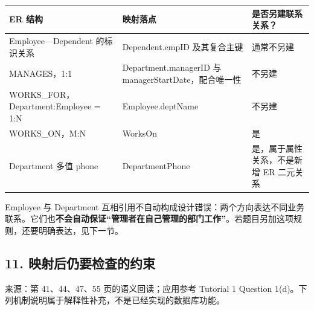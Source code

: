 \begin{longtable}[]{@{}
  >{\raggedright\arraybackslash}p{}
  >{\raggedright\arraybackslash}p{}
  >{\raggedright\arraybackslash}p{}@{}}
\toprule\noalign{}
\begin{minipage}[b]{\linewidth}\raggedright
ER 结构
\end{minipage} & \begin{minipage}[b]{\linewidth}\raggedright
映射落点
\end{minipage} & \begin{minipage}[b]{\linewidth}\raggedright
是否另建联系关系？
\end{minipage} \\
\midrule\noalign{}
\endhead
\bottomrule\noalign{}
\endlastfoot
Employee---Dependent 的标识关系 & Dependent.empID 及其复合主键 & 通常不另建 \\
MANAGES，1:1 & Department.managerID 与 managerStartDate，配合唯一性 & 不另建 \\
WORKS\_FOR，Department:Employee = 1:N & Employee.deptName & 不另建 \\
WORKS\_ON，M:N & WorksOn & 是 \\
Department 多值 phone & DepartmentPhone & 是，属于属性关系，不是新增 ER 二元关系 \\
\end{longtable}

Employee 与 Department 互相引用不自动构成设计错误：两个方向表达不同业务联系。它们也\textbf{不会自动保证``管理者在自己管理的部门工作''}。若题目另加这项规则，还要明确表达，见下一节。

\subsection{11. 映射后仍要检查的约束}\label{04_er_to_relational_mapping_zh-ux6620ux5c04ux540eux4ecdux8981ux68c0ux67e5ux7684ux7ea6ux675f}

来源：第 41、44、47、55 页的语义回读；应用参考 Tutorial 1 Question 1(d)。下列机制说明属于解释性补充，不是已经实现的数据库功能。

